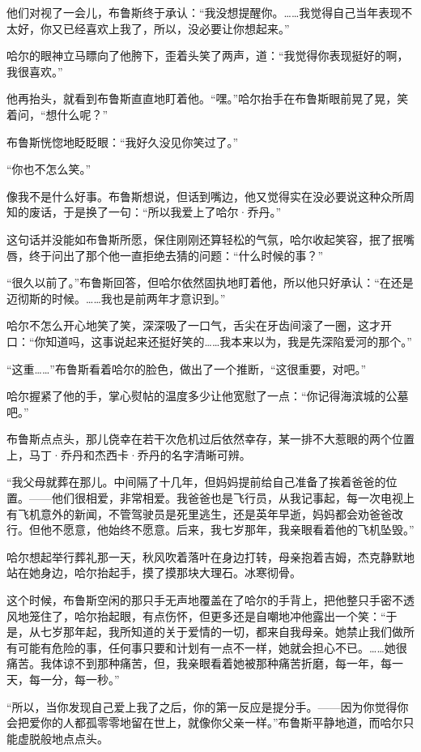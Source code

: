 \documentclass[../main]{subfiles}
\begin{document}
他们对视了一会儿，布鲁斯终于承认：“我没想提醒你。……我觉得自己当年表现不太好，你又已经喜欢上我了，所以，没必要让你想起来。”

哈尔的眼神立马瞟向了他胯下，歪着头笑了两声，道：“我觉得你表现挺好的啊，我很喜欢。”

他再抬头，就看到布鲁斯直直地盯着他。“嘿。”哈尔抬手在布鲁斯眼前晃了晃，笑着问，“想什么呢？”

布鲁斯恍惚地眨眨眼：“我好久没见你笑过了。”

“你也不怎么笑。”

像我不是什么好事。布鲁斯想说，但话到嘴边，他又觉得实在没必要说这种众所周知的废话，于是换了一句：“所以我爱上了哈尔·乔丹。”

这句话并没能如布鲁斯所愿，保住刚刚还算轻松的气氛，哈尔收起笑容，抿了抿嘴唇，终于问出了那个他一直拒绝去猜的问题：“什么时候的事？”

“很久以前了。”布鲁斯回答，但哈尔依然固执地盯着他，所以他只好承认：“在还是迈彻斯的时候。……我也是前两年才意识到。”

哈尔不怎么开心地笑了笑，深深吸了一口气，舌尖在牙齿间滚了一圈，这才开口：“你知道吗，这事说起来还挺好笑的……我本来以为，我是先深陷爱河的那个。”

“这重\ldots\ldots”布鲁斯看着哈尔的脸色，做出了一个推断，“这很重要，对吧。”

哈尔握紧了他的手，掌心熨帖的温度多少让他宽慰了一点：“你记得海滨城的公墓吧。”

布鲁斯点点头，那儿侥幸在若干次危机过后依然幸存，某一排不大惹眼的两个位置上，马丁·乔丹和杰西卡·乔丹的名字清晰可辨。

“我父母就葬在那儿。中间隔了十几年，但妈妈提前给自己准备了挨着爸爸的位置。——他们很相爱，非常相爱。我爸爸也是飞行员，从我记事起，每一次电视上有飞机意外的新闻，不管驾驶员是死里逃生，还是英年早逝，妈妈都会劝爸爸改行。但他不愿意，他始终不愿意。后来，我七岁那年，我亲眼看着他的飞机坠毁。”

哈尔想起举行葬礼那一天，秋风吹着落叶在身边打转，母亲抱着吉姆，杰克静默地站在她身边，哈尔抬起手，摸了摸那块大理石。冰寒彻骨。

这个时候，布鲁斯空闲的那只手无声地覆盖在了哈尔的手背上，把他整只手密不透风地笼住了，哈尔抬起眼，有点伤怀，但更多还是自嘲地冲他露出一个笑：“于是，从七岁那年起，我所知道的关于爱情的一切，都来自我母亲。她禁止我们做所有可能有危险的事，任何事只要和计划有一点不一样，她就会担心不已。……她很痛苦。我体谅不到那种痛苦，但，我亲眼看着她被那种痛苦折磨，每一年，每一天，每一分，每一秒。”

“所以，当你发现自己爱上我了之后，你的第一反应是提分手。——因为你觉得你会把爱你的人都孤零零地留在世上，就像你父亲一样。”布鲁斯平静地道，而哈尔只能虚脱般地点点头。
\end{document}
